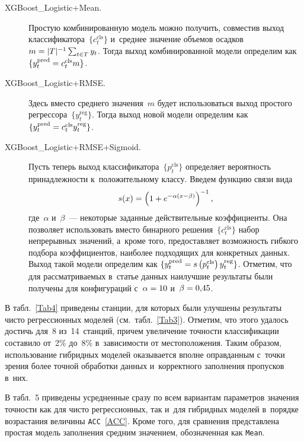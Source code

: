 \begin{multicols}{2}
\begin{description}
\item[XGBoost\_Logistic+Mean.] Простую комбинированную модель можно получить, 
совместив выход классификатора~$\{c^{\mathrm{cls}}_t\}$ и~среднее значение объемов 
осадков $m \hm= |T|^{-1}\sum\nolimits_{t \in T} y_t$. Тогда выход 
комбинированной модели определим как $\{y^{\mathrm{pred}}_t \hm= c^{\mathrm{cls}}_t m\}$.
\item[XGBoost\_Logistic+RMSE.] Здесь вместо среднего значения~$m$ 
будет использоваться выход прос\-то\-го регрессора~$\{y^{\mathrm{reg}}_t\}$. Тогда выход 
новой модели определим как $\{y^{\mathrm{pred}}_t \hm= 
c^{\mathrm{cls}}_t y^{\mathrm{reg}}_t\}$.
\item[XGBoost\_Logistic+RMSE+Sigmoid.] Пусть теперь выход 
классификатора~$\{p^{\mathrm{cls}}_t\}$ 
определяет вероятность принадлежности к~положительному классу. Введем функцию 
связи вида 
$$
s(x) = \left(1 \hm+ e^{-\alpha (x \hm- \beta)}\right)^{-1},
$$ 
где~$\alpha$ и~$\beta$~--- некоторые заданные действительные коэффициенты. 
Она позволяет использовать вместо бинарного решения~$\{c^{\mathrm{cls}}_t\}$ набор 
непрерывных значений, а~кроме того, предоставляет возможность гибкого 
подбора коэффициентов, наиболее подходящих для конкретных данных. Выход 
такой модели определим как $\{y^{\mathrm{pred}}_t \hm= s\left(p^{\mathrm{cls}}_t\right) 
 y^{\mathrm{reg}}_t\}$.  Отметим, что для рассматриваемых в~статье данных 
наилучшие результаты были получены для конфигураций 
с~$\alpha \hm= 10$ и~$\beta\hm = 0{,}45$.
\end{description}

В табл.~\ref{Tab4} приведены станции, для которых были улучшены 
результаты чисто регрессионных моделей (см.\ табл.~\ref{Tab3}). 
Отметим, что этого удалось достичь для~8 из~14~станций, причем увеличение 
точ\-ности классификации составило от~2\% до~8\% в~зависимости от местоположения. 
Таким образом, использование гибридных моделей оказывается вполне оправданным 
с~точки зрения более точной обработки данных и~корректного заполнения пропусков в~них.



В табл.~5 приведены усредненные сразу по всем вариантам 
параметров значения точности как для чисто регрессионных, так и~для гибридных 
моделей в~порядке возрастания величины \verb"ACC"~\eqref{ACC}. 
Кроме того, для сравнения представлена простая модель заполнения 
средним значением, обозначенная как \verb"Mean".




\end{multicols}
